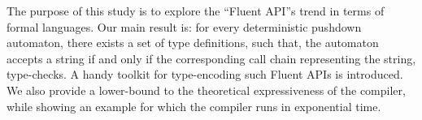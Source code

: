 The purpose of this study is to explore the ``Fluent API''s trend in
  terms of formal languages.
Our main result is: for every deterministic pushdown automaton,
  there exists a set of \Java type definitions, such that,
  the automaton accepts a string if and only if the corresponding 
  call chain representing the string, type-checks.
A handy toolkit for type-encoding such Fluent APIs is introduced.
We also provide a lower-bound to the theoretical expressiveness of the \Java compiler,
  while showing an example for which the compiler runs in exponential time.
  

